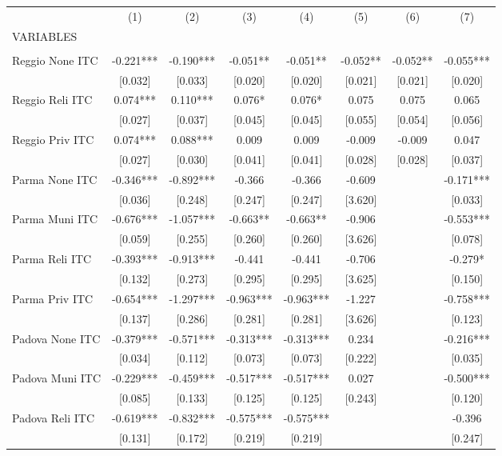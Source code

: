 \begin{tabular}{lccccccc} \hline
 & (1) & (2) & (3) & (4) & (5) & (6) & (7) \\
VARIABLES &  &  &  &  &  &  &  \\ \hline
 &  &  &  &  &  &  &  \\
Reggio None ITC & -0.221*** & -0.190*** & -0.051** & -0.051** & -0.052** & -0.052** & -0.055*** \\
 & [0.032] & [0.033] & [0.020] & [0.020] & [0.021] & [0.021] & [0.020] \\
Reggio Reli ITC & 0.074*** & 0.110*** & 0.076* & 0.076* & 0.075 & 0.075 & 0.065 \\
 & [0.027] & [0.037] & [0.045] & [0.045] & [0.055] & [0.054] & [0.056] \\
Reggio Priv ITC & 0.074*** & 0.088*** & 0.009 & 0.009 & -0.009 & -0.009 & 0.047 \\
 & [0.027] & [0.030] & [0.041] & [0.041] & [0.028] & [0.028] & [0.037] \\
Parma None ITC & -0.346*** & -0.892*** & -0.366 & -0.366 & -0.609 &  & -0.171*** \\
 & [0.036] & [0.248] & [0.247] & [0.247] & [3.620] &  & [0.033] \\
Parma Muni ITC & -0.676*** & -1.057*** & -0.663** & -0.663** & -0.906 &  & -0.553*** \\
 & [0.059] & [0.255] & [0.260] & [0.260] & [3.626] &  & [0.078] \\
Parma Reli ITC & -0.393*** & -0.913*** & -0.441 & -0.441 & -0.706 &  & -0.279* \\
 & [0.132] & [0.273] & [0.295] & [0.295] & [3.625] &  & [0.150] \\
Parma Priv ITC & -0.654*** & -1.297*** & -0.963*** & -0.963*** & -1.227 &  & -0.758*** \\
 & [0.137] & [0.286] & [0.281] & [0.281] & [3.626] &  & [0.123] \\
Padova None ITC & -0.379*** & -0.571*** & -0.313*** & -0.313*** & 0.234 &  & -0.216*** \\
 & [0.034] & [0.112] & [0.073] & [0.073] & [0.222] &  & [0.035] \\
Padova Muni ITC & -0.229*** & -0.459*** & -0.517*** & -0.517*** & 0.027 &  & -0.500*** \\
 & [0.085] & [0.133] & [0.125] & [0.125] & [0.243] &  & [0.120] \\
Padova Reli ITC & -0.619*** & -0.832*** & -0.575*** & -0.575*** &  &  & -0.396 \\
 & [0.131] & [0.172] & [0.219] & [0.219] &  &  & [0.247] \\

\end{tabular}

